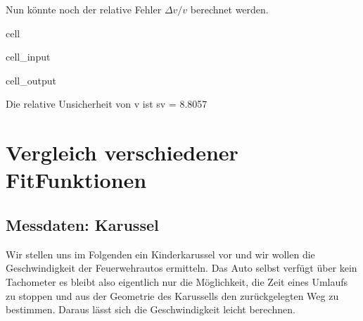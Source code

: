 \documentclass[letterpaper,10pt,english]{jupyterBook}
\begin{document}
\sphinxAtStartPar
Nun könnte noch der relative Fehler \(\Delta v/v\) berechnet werden.

\begin{sphinxuseclass}{cell}\begin{sphinxVerbatimInput}

\begin{sphinxuseclass}{cell_input}
\begin{sphinxVerbatim}[commandchars=\\\{\}]
 
\end{sphinxVerbatim}

\end{sphinxuseclass}\end{sphinxVerbatimInput}
\begin{sphinxVerbatimOutput}

\begin{sphinxuseclass}{cell_output}
\begin{sphinxVerbatim}[commandchars=\\\{\}]
Die relative Unsicherheit von v ist 	 s\PYGZus{}v = 8.8057 \PYGZpc{}
\end{sphinxVerbatim}

\end{sphinxuseclass}\end{sphinxVerbatimOutput}

\end{sphinxuseclass}
\sphinxstepscope


\section{Vergleich verschiedener Fit\sphinxhyphen{}Funktionen}
\label{\detokenize{content/T_LinReg:vergleich-verschiedener-fit-funktionen}}\label{\detokenize{content/T_LinReg::doc}}

\subsection{Messdaten: Karussel}
\label{\detokenize{content/T_LinReg:messdaten-karussel}}
\sphinxAtStartPar
Wir stellen uns im Folgenden ein Kinderkarussel vor und wir wollen die Geschwindigkeit der Feuerwehrautos ermitteln. Das Auto selbst verfügt über kein Tachometer \sphinxhyphen{} es bleibt also eigentlich nur die Möglichkeit, die Zeit eines Umlaufs zu stoppen und aus der Geometrie des Karussells den zurückgelegten Weg zu bestimmen. Daraus lässt sich die Geschwindigkeit leicht berechnen.
\end{document}
